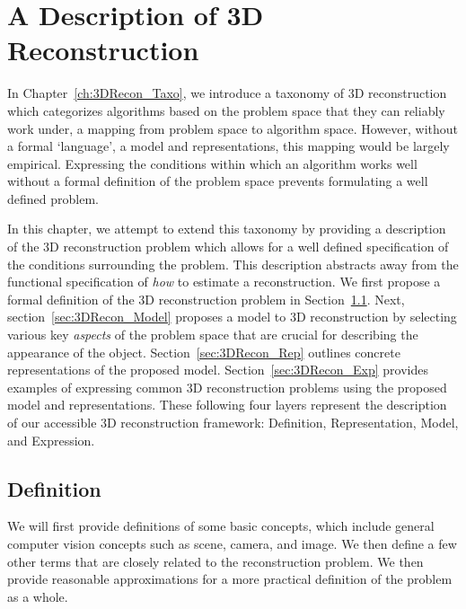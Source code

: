 
\chapter{A Description of 3D Reconstruction}
\label{ch:3DRecon_Desc}
In Chapter~\ref{ch:3DRecon_Taxo}, we introduce a taxonomy of 3D reconstruction which categorizes algorithms based on the problem space that they can reliably work under, \ie a mapping from problem space to algorithm space. However, without a formal `language', \ie a model and representations, this mapping would be largely empirical. Expressing the conditions within which an algorithm works well without a formal definition of the problem space prevents formulating a well defined problem.

In this chapter, we attempt to extend this taxonomy by providing a description of the 3D reconstruction problem which allows for a well defined specification of the conditions surrounding the problem. This description abstracts away from the functional specification of \textit{how} to estimate a reconstruction. We first propose a formal definition of the 3D reconstruction problem in Section~\ref{sec:3DRecon_Def}. Next, section~\ref{sec:3DRecon_Model} proposes a model to 3D reconstruction by selecting various key \textit{aspects} of the problem space that are crucial for describing the appearance of the object. Section~\ref{sec:3DRecon_Rep} outlines concrete representations of the proposed model. Section~\ref{sec:3DRecon_Exp} provides examples of expressing common 3D reconstruction problems using the proposed model and representations. These following four layers represent the description of our accessible 3D reconstruction framework: Definition, Representation, Model, and Expression.


\section{Definition}
\label{sec:3DRecon_Def}
We will first provide definitions of some basic concepts, which include general computer vision concepts such as scene, camera, and image. We then define a few other terms that are closely related to the reconstruction problem. We then provide reasonable approximations for a more practical definition of the problem as a whole.

